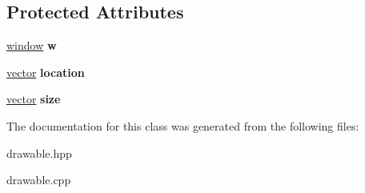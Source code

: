 \subsection*{Protected Attributes}
\begin{DoxyCompactItemize}
\item 
\mbox{\label{classdrawable_a74aa041db41174597299018067370a03}} 
\hyperlink{classwindow}{window} {\bfseries w}
\item 
\mbox{\label{classdrawable_a7bff9c348bd2786022360c144f6a4212}} 
\hyperlink{classvector}{vector} {\bfseries location}
\item 
\mbox{\label{classdrawable_aade7fdbfa85d4d5d737777451e6593e9}} 
\hyperlink{classvector}{vector} {\bfseries size}
\end{DoxyCompactItemize}


The documentation for this class was generated from the following files\+:\begin{DoxyCompactItemize}
\item 
drawable.\+hpp\item 
drawable.\+cpp\end{DoxyCompactItemize}

